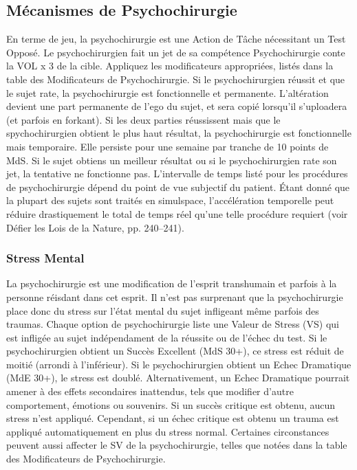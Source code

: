 \subsection{Mécanismes de Psychochirurgie} En terme de jeu, la psychochirurgie est une Action de Tâche nécessitant un Test Opposé. Le psychochirurgien fait un jet de sa compétence Psychochirurgie conte la VOL x 3 de la cible. Appliquez les modificateurs appropriées, listés dans la table des Modificateurs de Psychochirurgie. Si le psychochirurgien réussit et que le sujet rate, la psychochirurgie est fonctionnelle et permanente. L'altération devient une part permanente de l'ego du sujet, et sera copié lorsqu'il s'uploadera (et parfois en forkant). Si les deux parties réussissent mais que le spychochirurgien obtient le plus haut résultat, la psychochirurgie est fonctionnelle mais temporaire. Elle persiste pour une semaine par tranche de 10 points de MdS. Si le sujet obtiens un meilleur résultat ou si le psychochirurgien rate son jet, la tentative ne fonctionne pas. L'intervalle de temps listé pour les procédures de psychochirurgie dépend du point de vue subjectif du patient. Étant donné que la plupart des sujets sont traités en simulspace, l'accélération temporelle peut réduire drastiquement le total de temps réel qu'une telle procédure requiert (voir Défier les Lois de la Nature, pp. 240–241). 

\subsubsection{Stress Mental} La psychochirurgie est une modification de l'esprit transhumain et parfois à la personne réisdant dans cet esprit. Il n'est pas surprenant que la psychochirurgie place donc du stress sur l'état mental du sujet infligeant même parfois des traumas. Chaque option de psychochirurgie liste une Valeur de Stress (VS) qui est infligée au sujet indépendament de la réussite ou de l'échec du test. Si le psychochirurgien obtient un Succès Excellent (MdS 30+), ce stress est réduit de moitié (arrondi à l'inférieur). Si le psychochirurgien obtient un Echec Dramatique (MdE 30+), le stress est doublé. Alternativement, un Echec Dramatique pourrait amener à des effets secondaires inattendus, tels que modifier d'autre comportement, émotions ou souvenirs. Si un succès critique est obtenu, aucun stress n'est appliqué. Cependant, si un échec critique est obtenu un trauma est appliqué automatiquement en plus du stress normal. Certaines circonstances peuvent aussi affecter le SV de la psychochirurgie, telles que notées dans la table des Modificateurs de Psychochirurgie. 

